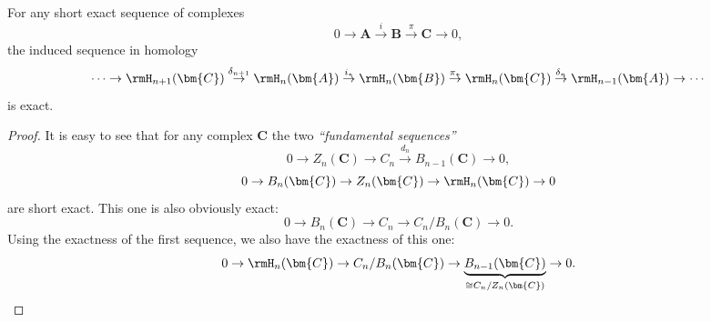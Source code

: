 \begin{lem}\label{lem long exact seq in homology} 
    For any short exact sequence of complexes 
    \[0\to \bm{A}\overset i\to \bm{B}\overset\pi\to \bm{C}\to 0 ,\]
    the induced sequence in homology
    \[\cdots \to \rmH_{n+1}(\bm{C})\overset{\delta_{n+1}}\to \rmH_n(\bm{A})\overset{i_\ast}\to \rmH_n(\bm{B})\overset{\pi_\ast}\to \rmH_n(\bm{C})\overset{\delta_n}\to \rmH_{n-1}(\bm{A})\to \cdots \]
    is exact.
\end{lem}
\begin{proof}
    It is easy to see that for any complex $\bm{C}$ the two \emph{``fundamental sequences''}
    \[0\to Z_n(\bm{C})\to C_n\overset{d_n}\to B_{n-1}(\bm{C})\to 0,\]
    \[0\to B_n(\bm{C})\to Z_n(\bm{C})\to \rmH_n(\bm{C})\to 0\]
    are short exact.
    This one is also obviously exact:
    \[0\to B_n(\bm{C})\to C_n\to C_n/B_n(\bm{C})\to 0.\]
    Using the exactness of the first sequence, we also have the exactness of this one:
    \[0\to \rmH_n(\bm{C})\to C_n/B_n(\bm{C})\to \underbrace{B_{n-1}(\bm{C})}_{\cong C_n/Z_n(\bm{C})}\to 0.\]
    

\end{proof}
